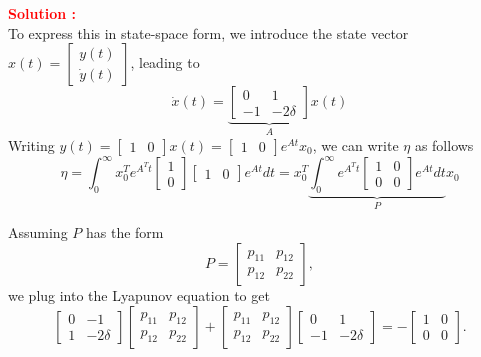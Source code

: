 \documentclass[12pt]{article}
\begin{document}
\textbf{\textcolor{red}{Solution :}} \\
To express this in state-space form, we introduce the state vector $x(t) = \begin{bmatrix} y(t) \\ \dot{y}(t) \end{bmatrix}$, leading to
\begin{equation}
    \dot{x}(t) = \underbrace{\begin{bmatrix} 0 & 1 \\ -1 & -2\delta \end{bmatrix}}_{A} x(t) 
\end{equation}
Writing \(y(t) = \begin{bmatrix}
    1 & 0
\end{bmatrix} x(t) = \begin{bmatrix}
    1 & 0

\end{bmatrix} e^{At} x_0 \), we can write \(\eta\) as follows
\begin{equation}
    \eta = \int_0^{\infty} x_0^T e^{A^Tt} \begin{bmatrix}
        1 \\ 0
    \end{bmatrix} \begin{bmatrix}
        1 & 0
    \end{bmatrix} e^{At} dt = x_0^T \underbrace{\int_0^{\infty} e^{A^Tt} \begin{bmatrix}
        1 & 0 \\ 0 & 0
    \end{bmatrix} e^{At} dt}_{P} x_0
\end{equation}

Assuming $P$ has the form
\[
P = \begin{bmatrix} p_{11} & p_{12} \\ p_{12} & p_{22} \end{bmatrix},
\]
we plug into the Lyapunov equation to get
\[
\begin{bmatrix} 0 & -1 \\ 1 & -2\delta \end{bmatrix} \begin{bmatrix} p_{11} & p_{12} \\ p_{12} & p_{22} \end{bmatrix} + \begin{bmatrix} p_{11} & p_{12} \\ p_{12} & p_{22} \end{bmatrix} \begin{bmatrix} 0 & 1 \\ -1 & -2\delta \end{bmatrix} = -\begin{bmatrix} 1 & 0 \\ 0 & 0 \end{bmatrix}.
\]
\end{document}
